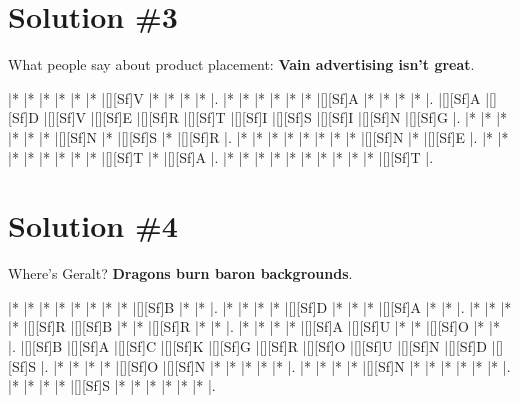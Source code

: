\documentclass[letterpaper]{article}
\begin{document}
\newpage
\section*{Solution \#3}
What people say about product placement:
\newline\textbf{Vain advertising isn't great}.
\vspace*{1em}
\begin{Puzzle}{11}{7}
|*        |*        |*        |*        |*        |*        |[][Sf]V  |*        |*        |*        |*        |.
|*        |*        |*        |*        |*        |*        |[][Sf]A  |*        |*        |*        |*        |.  
|[][Sf]A  |[][Sf]D  |[][Sf]V  |[][Sf]E  |[][Sf]R  |[][Sf]T  |[][Sf]I  |[][Sf]S  |[][Sf]I  |[][Sf]N  |[][Sf]G  |.
|*        |*        |*        |*        |*        |*        |[][Sf]N  |*        |[][Sf]S  |*        |[][Sf]R  |. 
|*        |*        |*        |*        |*        |*        |*        |*        |[][Sf]N  |*        |[][Sf]E  |.
|*        |*        |*        |*        |*        |*        |*        |*        |[][Sf]T  |*        |[][Sf]A  |.
|*        |*        |*        |*        |*        |*        |*        |*        |*        |*        |[][Sf]T  |.
\end{Puzzle}

\newpage
\section*{Solution \#4}
Where's Geralt?
\newline\textbf{Dragons burn baron backgrounds}.

\vspace*{1em}
\begin{Puzzle}{11}{8}
|*        |*        |*        |*        |*        |*        |*        |*        |[][Sf]B  |*        |*        |. 
|*        |*        |*        |*        |[][Sf]D  |*        |*        |*        |[][Sf]A  |*        |*        |.  
|*        |*        |*        |*        |[][Sf]R  |[][Sf]B  |*        |*        |[][Sf]R  |*        |*        |.
|*        |*        |*        |*        |[][Sf]A  |[][Sf]U  |*        |*        |[][Sf]O  |*        |*        |.  
|[][Sf]B  |[][Sf]A  |[][Sf]C  |[][Sf]K  |[][Sf]G  |[][Sf]R  |[][Sf]O  |[][Sf]U  |[][Sf]N  |[][Sf]D  |[][Sf]S  |.
|*        |*        |*        |*        |[][Sf]O  |[][Sf]N  |*        |*        |*        |*        |*        |. 
|*        |*        |*        |*        |[][Sf]N  |*        |*        |*        |*        |*        |*        |.
|*        |*        |*        |*        |[][Sf]S  |*        |*        |*        |*        |*        |*        |.
\end{Puzzle}
\end{document}
